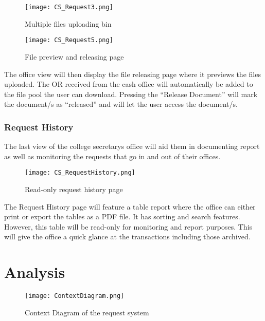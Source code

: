 \begin{figure}[h]
    \centering 
    \begin{minipage}[c]{0.5\linewidth}
        \centering
        \texttt{[image: CS\_Request3.png]}
        \caption{Multiple files uploading bin}
        \label{fig:CS_Request3}
    \end{minipage}
\end{figure}

\begin{figure}[h]
    \centering 
    \begin{minipage}[c]{0.5\linewidth}
        \centering
        \texttt{[image: CS\_Request5.png]}
        \caption{File preview and releasing page}
        \label{fig:CS_Request5}
    \end{minipage}
\end{figure}

The office view will then display the file releasing page where it previews the files uploaded. The OR received from the cash office will automatically be added to the file pool the user can download. Pressing the “Release Document” will mark the document/s as “released” and will let the user access the document/s.

\subsubsection{Request History}

The last view of the college secretary\textsc{}s office will aid them in documenting report as well as monitoring the requests that go in and out of their offices.

\begin{figure}[h]
    \centering 
    \begin{minipage}[c]{0.5\linewidth}
        \centering
        \texttt{[image: CS\_RequestHistory.png]}
        \caption{Read-only request history page}
        \label{fig:CS_RequestHistory}
    \end{minipage}
\end{figure}

The Request History page will feature a table report where the office can either print or export the tables as a PDF file. It has sorting and search features. However, this table will be read-only for monitoring and report purposes. This will give the office a quick glance at the transactions including those archived.

\section{Analysis}
    \begin{figure}[h]
        \centering 
        \begin{minipage}[c]{0.7\linewidth}
            \centering
            \texttt{[image: ContextDiagram.png]}
            \caption{Context Diagram of the request system}
            \label{fig:ContextDiagra}
        \end{minipage}
    \end{figure}
    

